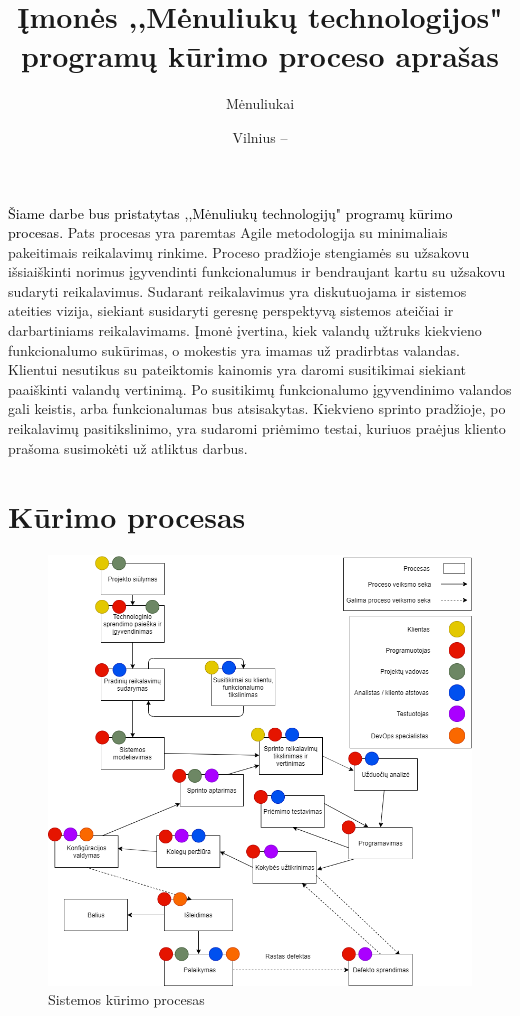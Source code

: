 \documentclass{VUMIFPSkursinis}
\title{Įmonės ,,Mėnuliukų technologijos" programų kūrimo proceso aprašas}
\author{Mėnuliukai}
\date{Vilnius – \the\year}
\begin{document}
\maketitle

\tableofcontents

	\textcolor{black}{Šiame darbe bus pristatytas ,,Mėnuliukų technologijų" programų kūrimo procesas.}
	Pats procesas yra paremtas Agile metodologija su minimaliais pakeitimais reikalavimų rinkime.
	Proceso pradžioje stengiamės su užsakovu išsiaiškinti norimus įgyvendinti funkcionalumus ir bendraujant kartu su užsakovu sudaryti reikalavimus.
	Sudarant reikalavimus yra diskutuojama ir sistemos ateities vizija, siekiant susidaryti geresnę perspektyvą sistemos ateičiai ir darbartiniams reikalavimams.
	Įmonė įvertina, kiek valandų užtruks kiekvieno funkcionalumo sukūrimas, o mokestis yra imamas už pradirbtas valandas.
	Klientui nesutikus su pateiktomis kainomis yra daromi susitikimai siekiant paaiškinti valandų vertinimą. Po susitikimų funkcionalumo įgyvendinimo valandos gali keistis, arba funkcionalumas bus atsisakytas.
	Kiekvieno sprinto pradžioje, po reikalavimų pasitikslinimo, yra sudaromi priėmimo testai, kuriuos praėjus kliento prašoma susimokėti už atliktus darbus.

\section{Kūrimo procesas}
	\begin{figure}[htbp]
		\includegraphics[scale=0.6]{img/SoftwareProcessMoonTechnologies}
		\caption{Sistemos kūrimo procesas} %
		\label{img:kurimoProcesas}
	\end{figure}
\end{document}
